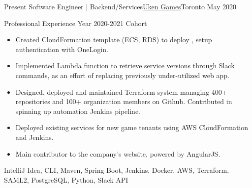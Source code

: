 %
%
%
\begin{experiences}
  \experience
    {Present}   {Software Engineer | Backend/Services}{\href{https://uken.com}{Uken Games}}{Toronto}
    {May 2020} {
                    Professional Experience Year 2020-2021 Cohort 
                    \begin{itemize}
                        \item Created CloudFormation template (ECS, RDS) to deploy , setup authentication with OneLogin.
                        
                        \item Implemented Lambda function to retrieve service versions through Slack commands, as an effort of replacing previously under-utilized web app.
                        
                        \item Designed, deployed and maintained Terraform system managing 400+ repositories and 100+ organization members on Github. Contributed in spinning up automation Jenkins pipeline.
                        
                        \item Deployed existing services for new game tenants using AWS CloudFormation and Jenkins.
                        
                        \item Main contributor to the company's website, powered by AngularJS.
                    \end{itemize}
                    }
                    {IntelliJ Idea, CLI, Maven, Spring Boot, Jenkins, Docker, AWS, Terraform, SAML2, PostgreSQL, Python, Slack API}
\end{experiences}
